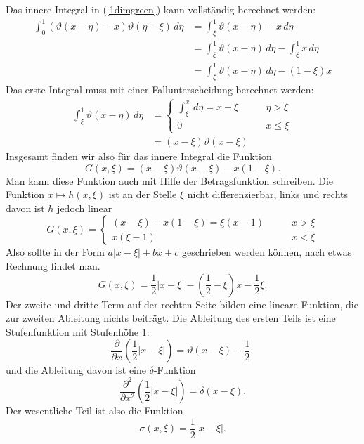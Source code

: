 Das innere Integral in (\ref{1dimgreen}) kann vollständig berechnet
werden:
\begin{align*}
\int_0^1(\vartheta(x-\eta)-x)\vartheta(\eta-\xi)\,d\eta
&=
\int_\xi^1\vartheta(x-\eta)-x\,d\eta
\\
&=
\int_\xi^1\vartheta(x-\eta)\,d\eta-\int_\xi^1x\,d\eta
\\
&=
\int_\xi^1\vartheta(x-\eta)\,d\eta-(1-\xi)x
\end{align*}
Das erste Integral muss mit einer Fallunterscheidung berechnet werden:
\begin{align*}
\int_\xi^1\vartheta(x-\eta)\,d\eta
&=
\begin{cases}
\int_\xi^x\,d\eta=x-\xi&\qquad\eta>\xi\\
0&\qquad x\le \xi
\end{cases}
\\
&=(x-\xi)\vartheta(x-\xi)
\end{align*}
Insgesamt finden wir also für das innere
Integral die Funktion
\[
G(x,\xi)=(x-\xi)\vartheta(x-\xi)-x(1-\xi).
\]
Man kann diese Funktion auch mit Hilfe der Betragsfunktion
schreiben.
Die Funktion $x\mapsto h(x,\xi)$ ist an der Stelle $\xi$ nicht 
differenzierbar, links und rechts davon ist $h$ jedoch linear
\[
G(x,\xi)=\begin{cases}
(x-\xi)-x(1-\xi)=\xi(x-1)&\qquad x>\xi\\
x(\xi-1)&\qquad x<\xi
\end{cases}
\]
Also sollte in der Form $a|x-\xi|+bx+c$ geschrieben
werden können, nach etwas Rechnung findet man.
\[
G(x,\xi)={\textstyle \frac12}|x-\xi|-({\textstyle \frac12}-\xi)x-{\textstyle\frac12}\xi.
\]
Der zweite und dritte Term auf der rechten Seite bilden eine lineare
Funktion, die zur zweiten Ableitung nichts beiträgt. Die Ableitung
des ersten Teils ist eine Stufenfunktion mit Stufenhöhe $1$:
\[
\frac{\partial}{\partial x}({\textstyle \frac12}|x-\xi|)
=
\vartheta(x-\xi)
-
{\textstyle\frac12},
\]
und die Ableitung davon ist eine $\delta$-Funktion
\[
\frac{\partial^2}{\partial x^2}({\textstyle \frac12}|x-\xi|)
=
\delta(x-\xi).
\]
Der wesentliche Teil ist also die Funktion
\begin{equation}
\sigma(x,\xi)=\frac12|x-\xi|.\label{n1sigma}
\end{equation}

